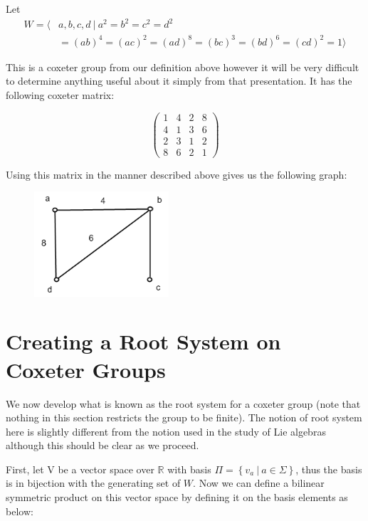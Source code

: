 \documentclass[a4paper,12pt]{article}
\begin{document}
\begin{example}
Let 
\begin{align*}
	W = \langle& a,b,c,d \: | \: a^2 = b^2 = c^2 = d^2 \\
	&= (ab)^4 = (ac)^2 = (ad)^8 = (bc)^3 = (bd)^6 = (cd)^2 = 1\rangle
\end{align*}
	
This is a coxeter group from our definition above however it will be very difficult to determine anything useful about it simply from that presentation. It has the following coxeter matrix:
	
\[ \left( \begin{array}{cccc}
1 & 4 & 2 & 8 \\
4 & 1 & 3 & 6 \\
2 & 3 & 1 & 2 \\
8 & 6 & 2 & 1
\end{array} \right) \]

Using this matrix in the manner described above gives us the following graph:

\begin{figure}[H]
	\centering
		\includegraphics[width=50mm]{rand_graph.png}
	\label{fig:rand_graph}
\end{figure}

\end{example}

\section{Creating a Root System on Coxeter Groups}
We now develop what is known as the root system for a coxeter group (note that nothing in this section restricts the group to be finite). The notion of root system here is slightly different from the notion used in the study of Lie algebras although this should be clear as we proceed.

First, let V be a vector space over $\mathbb{R}$ with basis $\Pi = \left\{v_a \: | \: a \in \Sigma\right\}$, thus the basis is in bijection with the generating set of $W$.
Now we can define a bilinear symmetric product on this vector space by defining it on the basis elements as below:
\end{document}
